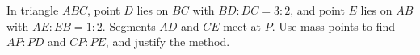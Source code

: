 In triangle \(ABC\), point \(D\) lies on \(BC\) with \(BD:DC=3:2\), and point \(E\) lies on \(AB\) with \(AE:EB=1:2\). Segments \(AD\) and \(CE\) meet at \(P\). Use mass points to find \(AP:PD\) and \(CP:PE\), and justify the method.
